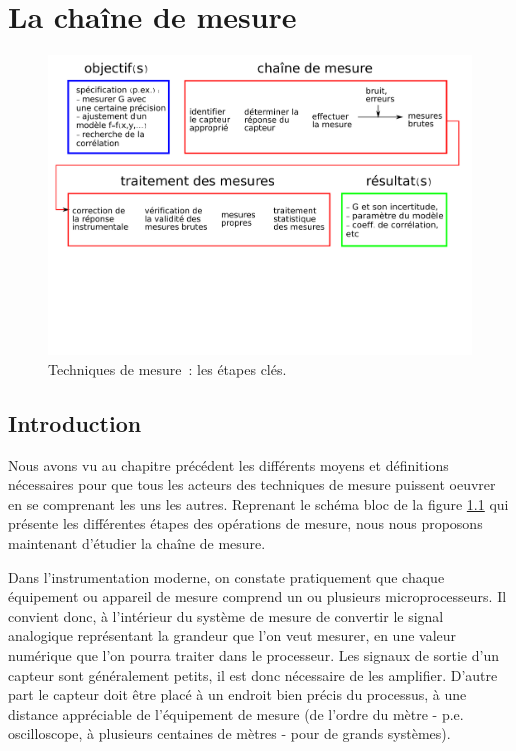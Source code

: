 \chapter{La chaîne de mesure}

\begin{figure}[ht]
   \centering
   \vspace{-5mm}
   \includegraphics[width=\textwidth]{assets/figures/flowChartTechMes.pdf}
   \caption{Techniques de mesure~: les étapes clés.}
   \label{fig:flowChartTechMes_chaine_de_mesure}
\end{figure}

\section{Introduction}

Nous avons vu au chapitre précédent les différents moyens et définitions nécessaires pour que tous les acteurs des techniques de mesure puissent oeuvrer en se comprenant les uns les autres. Reprenant le schéma bloc de la figure \ref{fig:flowChartTechMes_chaine_de_mesure} qui présente les différentes étapes des opérations de mesure, nous nous proposons maintenant d'étudier la chaîne de mesure.

Dans l'instrumentation moderne, on constate pratiquement que chaque équipement ou appareil de mesure comprend un ou plusieurs microprocesseurs. Il convient donc, à l'intérieur du système de mesure de convertir le signal analogique représentant la grandeur que l'on veut mesurer, en une valeur numérique que l'on pourra traiter dans le processeur. Les signaux de sortie d'un capteur sont généralement petits, il est donc nécessaire de les amplifier. D'autre part le capteur doit être placé à un endroit bien précis du processus, à une distance appréciable de l'équipement de mesure (de l'ordre du mètre - p.e. oscilloscope, à plusieurs centaines de mètres - pour de grands systèmes).

